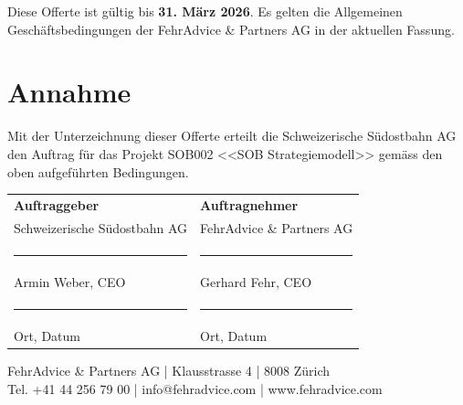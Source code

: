 \documentclass{fehradvice-report}
\begin{document}
Diese Offerte ist gültig bis \textbf{31. März 2026}. Es gelten die Allgemeinen Geschäftsbedingungen der FehrAdvice \& Partners AG in der aktuellen Fassung.

\newpage
\section*{Annahme}

Mit der Unterzeichnung dieser Offerte erteilt die Schweizerische Südostbahn AG den Auftrag für das Projekt SOB002 <<SOB Strategiemodell>> gemäss den oben aufgeführten Bedingungen.

\vspace{2cm}

\begin{center}
\begin{tabular}{p{7cm}p{7cm}}
\textbf{Auftraggeber} & \textbf{Auftragnehmer} \\[0.5cm]
Schweizerische Südostbahn AG & FehrAdvice \& Partners AG \\[2cm]
\rule{6cm}{0.4pt} & \rule{6cm}{0.4pt} \\
Armin Weber, CEO & Gerhard Fehr, CEO \\[1cm]
\rule{6cm}{0.4pt} & \rule{6cm}{0.4pt} \\
Ort, Datum & Ort, Datum \\
\end{tabular}
\end{center}

\vspace{2cm}

\begin{center}
\small{
FehrAdvice \& Partners AG | Klausstrasse 4 | 8008 Zürich\\
Tel. +41 44 256 79 00 | info@fehradvice.com | www.fehradvice.com
}
\end{center}
\end{document}

